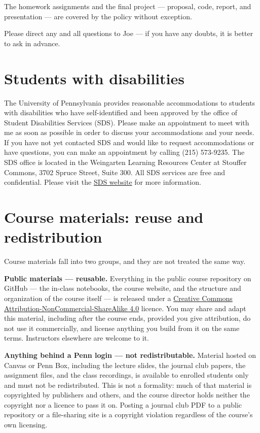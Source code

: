 \documentclass[11pt]{article}
\begin{document}
The homework assignments and the final project --- proposal, code, report, and presentation ---
are covered by the policy without exception.

Please direct any and all questions to Joe --- if you have any doubts, it is better to ask in
advance.

\section{Students with disabilities}

The University of Pennsylvania provides reasonable accommodations to students with disabilities
who have self-identified and been approved by the office of Student Disabilities Services (SDS).
Please make an appointment to meet with me as soon as possible in order to discuss your
accommodations and your needs. If you have not yet contacted SDS and would like to request
accommodations or have questions, you can make an appointment by calling (215) 573-9235. The SDS
office is located in the Weingarten Learning Resources Center at Stouffer Commons, 3702 Spruce
Street, Suite 300. All SDS services are free and confidential. Please visit the
\href{https://www.vpul.upenn.edu/lrc/sds/}{SDS website} for more information.

\section{Course materials: reuse and redistribution}

Course materials fall into two groups, and they are not treated the same way.

\textbf{Public materials --- reusable.} Everything in the public course repository on GitHub ---
the in-class notebooks, the course website, and the structure and organization of the course
itself --- is released under a
\href{https://creativecommons.org/licenses/by-nc-sa/4.0/}{Creative Commons
Attribution-NonCommercial-ShareAlike 4.0} licence. You may share and adapt this material,
including after the course ends, provided you give attribution, do not use it commercially, and
license anything you build from it on the same terms. Instructors elsewhere are welcome to it.

\textbf{Anything behind a Penn login --- not redistributable.} Material hosted on Canvas or Penn
Box, including the lecture slides, the journal club papers, the assignment files, and the class
recordings, is available to enrolled students only and must not be redistributed. This is not a
formality: much of that material is copyrighted by publishers and others, and the course director
holds neither the copyright nor a licence to pass it on. Posting a journal club PDF to a public
repository or a file-sharing site is a copyright violation regardless of the course's own
licensing.
\end{document}
